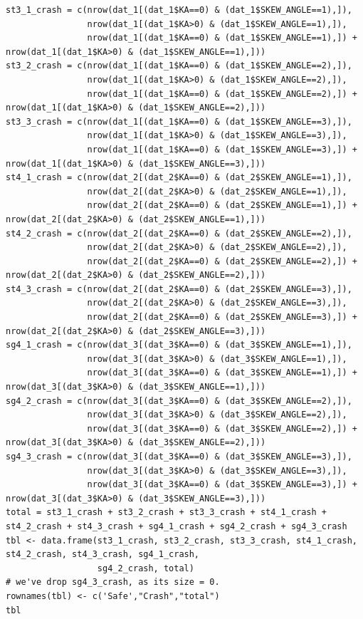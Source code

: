 \documentclass[11pt]{scrartcl} %
\begin{document}
\begin{lstlisting}
st3_1_crash = c(nrow(dat_1[(dat_1$KA==0) & (dat_1$SKEW_ANGLE==1),]),
                nrow(dat_1[(dat_1$KA>0) & (dat_1$SKEW_ANGLE==1),]),
                nrow(dat_1[(dat_1$KA==0) & (dat_1$SKEW_ANGLE==1),]) + nrow(dat_1[(dat_1$KA>0) & (dat_1$SKEW_ANGLE==1),]))
st3_2_crash = c(nrow(dat_1[(dat_1$KA==0) & (dat_1$SKEW_ANGLE==2),]),
                nrow(dat_1[(dat_1$KA>0) & (dat_1$SKEW_ANGLE==2),]),
                nrow(dat_1[(dat_1$KA==0) & (dat_1$SKEW_ANGLE==2),]) + nrow(dat_1[(dat_1$KA>0) & (dat_1$SKEW_ANGLE==2),]))
st3_3_crash = c(nrow(dat_1[(dat_1$KA==0) & (dat_1$SKEW_ANGLE==3),]),
                nrow(dat_1[(dat_1$KA>0) & (dat_1$SKEW_ANGLE==3),]),
                nrow(dat_1[(dat_1$KA==0) & (dat_1$SKEW_ANGLE==3),]) + nrow(dat_1[(dat_1$KA>0) & (dat_1$SKEW_ANGLE==3),]))
st4_1_crash = c(nrow(dat_2[(dat_2$KA==0) & (dat_2$SKEW_ANGLE==1),]),
                nrow(dat_2[(dat_2$KA>0) & (dat_2$SKEW_ANGLE==1),]),
                nrow(dat_2[(dat_2$KA==0) & (dat_2$SKEW_ANGLE==1),]) + nrow(dat_2[(dat_2$KA>0) & (dat_2$SKEW_ANGLE==1),]))
st4_2_crash = c(nrow(dat_2[(dat_2$KA==0) & (dat_2$SKEW_ANGLE==2),]),
                nrow(dat_2[(dat_2$KA>0) & (dat_2$SKEW_ANGLE==2),]),
                nrow(dat_2[(dat_2$KA==0) & (dat_2$SKEW_ANGLE==2),]) + nrow(dat_2[(dat_2$KA>0) & (dat_2$SKEW_ANGLE==2),]))
st4_3_crash = c(nrow(dat_2[(dat_2$KA==0) & (dat_2$SKEW_ANGLE==3),]),
                nrow(dat_2[(dat_2$KA>0) & (dat_2$SKEW_ANGLE==3),]),
                nrow(dat_2[(dat_2$KA==0) & (dat_2$SKEW_ANGLE==3),]) + nrow(dat_2[(dat_2$KA>0) & (dat_2$SKEW_ANGLE==3),]))
sg4_1_crash = c(nrow(dat_3[(dat_3$KA==0) & (dat_3$SKEW_ANGLE==1),]),
                nrow(dat_3[(dat_3$KA>0) & (dat_3$SKEW_ANGLE==1),]),
                nrow(dat_3[(dat_3$KA==0) & (dat_3$SKEW_ANGLE==1),]) + nrow(dat_3[(dat_3$KA>0) & (dat_3$SKEW_ANGLE==1),]))
sg4_2_crash = c(nrow(dat_3[(dat_3$KA==0) & (dat_3$SKEW_ANGLE==2),]),
                nrow(dat_3[(dat_3$KA>0) & (dat_3$SKEW_ANGLE==2),]),
                nrow(dat_3[(dat_3$KA==0) & (dat_3$SKEW_ANGLE==2),]) + nrow(dat_3[(dat_3$KA>0) & (dat_3$SKEW_ANGLE==2),]))
sg4_3_crash = c(nrow(dat_3[(dat_3$KA==0) & (dat_3$SKEW_ANGLE==3),]),
                nrow(dat_3[(dat_3$KA>0) & (dat_3$SKEW_ANGLE==3),]),
                nrow(dat_3[(dat_3$KA==0) & (dat_3$SKEW_ANGLE==3),]) + nrow(dat_3[(dat_3$KA>0) & (dat_3$SKEW_ANGLE==3),]))
total = st3_1_crash + st3_2_crash + st3_3_crash + st4_1_crash + st4_2_crash + st4_3_crash + sg4_1_crash + sg4_2_crash + sg4_3_crash
tbl <- data.frame(st3_1_crash, st3_2_crash, st3_3_crash, st4_1_crash, st4_2_crash, st4_3_crash, sg4_1_crash,
                  sg4_2_crash, total)
# we've drop sg4_3_crash, as its size = 0.
rownames(tbl) <- c('Safe',"Crash","total")
tbl



\end{lstlisting}
\end{document}
